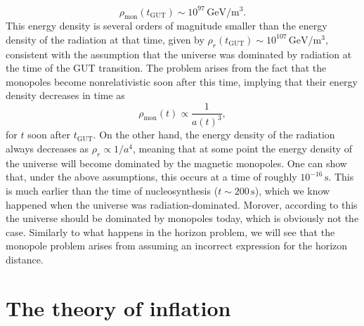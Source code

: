 \documentclass[11pt, a4paper,oneside,openright]{book}
\numberwithin{equation}{section}
\begin{document}
\begin{equation}
\rho_{\mathrm{mon}}(t_{\mathrm{GUT}})\sim 10^{97}\,\mathrm{GeV/m^3}.
\end{equation}
This energy density is several orders of magnitude smaller than the energy density of the radiation at that time, given by $\rho_r(t_{\mathrm{GUT}})\sim 10^{107}\,\mathrm{GeV/m^3}$, consistent with the assumption that the universe was dominated by radiation at the time of the GUT transition. The problem arises from the fact that the monopoles become nonrelativistic soon after this time, implying that their energy density decreases in time as
\begin{equation}
\rho_{\mathrm{mon}}(t)\propto \frac{1}{a(t)^3},
\end{equation}
for $t$ soon after $t_{\mathrm{GUT}}$. On the other hand, the energy density of the radiation always decreases as $\rho_r\propto 1/a^4$, meaning that at some point the energy density of the universe will become dominated by the magnetic monopoles. One can show that, under the above assumptions, this occurs at a time of roughly $10^{-16}\,\mathrm{s}$. This is much earlier than the time of nucleosynthesis ($t\sim 200\,\mathrm{s}$), which we know happened when the universe was radiation-dominated. Morover, according to this the universe should be dominated by monopoles today, which is obviously not the case. Similarly to what happens in the horizon problem, we will see that the monopole problem arises from assuming an incorrect expression for the horizon distance.

\section{The theory of inflation}
\end{document}
